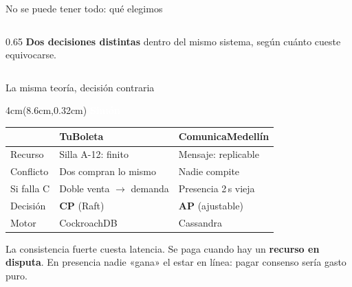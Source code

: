 \documentclass[aspectratio=169,11pt]{beamer}
\newcommand{\quien}[1]{%
  \begin{textblock*}{4cm}(8.6cm,0.32cm)
    \tiny\textcolor{white}{\textbf{#1}}
  \end{textblock*}}
\begin{document}
\begin{frame}{No se puede tener todo: qué elegimos}
\begin{columns}[T]
\begin{column}{0.65\textwidth}
\vspace{7pt}
{\scriptsize\textcolor{cmGris}{\textbf{Dos decisiones distintas} dentro del mismo
sistema, según cuánto cueste equivocarse.}}
\end{column}
\end{columns}
\end{frame}

\begin{frame}{La misma teoría, decisión contraria}
\quien{Simón}
\centering\small
\begin{tabular}{@{}lll@{}}
\toprule
 & \textbf{TuBoleta} & \textbf{ComunicaMedellín} \\
\midrule
Recurso & Silla A-12: finito & Mensaje: replicable \\
Conflicto & Dos compran lo mismo & Nadie compite \\
Si falla C & Doble venta $\rightarrow$ demanda & Presencia 2\,s vieja \\
Decisión & \textcolor{rojo}{\textbf{CP}} (Raft) & \textcolor{verde}{\textbf{AP}} (ajustable) \\
Motor & CockroachDB & Cassandra \\
\bottomrule
\end{tabular}
\vspace{14pt}
\begin{block}{}
\small La consistencia fuerte cuesta latencia. Se paga cuando hay un
\textbf{recurso en disputa}. En presencia nadie «gana» el estar en línea:
pagar consenso sería gasto puro.
\end{block}
\end{frame}
\end{document}
